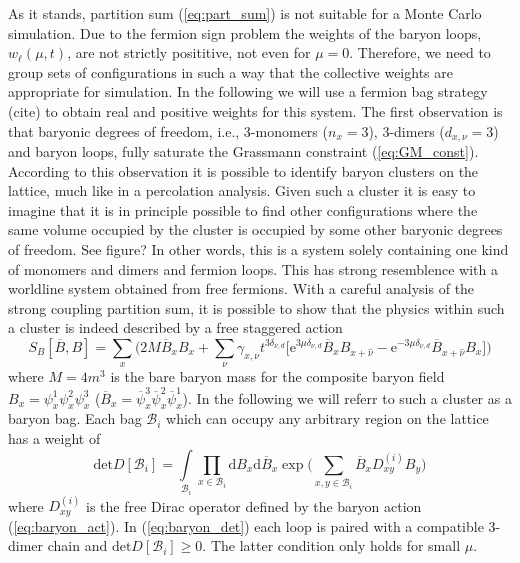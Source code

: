 \documentclass{PoS}
\begin{document}
As it stands, partition sum (\ref{eq:part_sum}) is not suitable for a Monte Carlo simulation. Due to the fermion sign problem the weights of the baryon loops, $w_{\ell}(\mu,t)$, are not strictly posititive, not even for $\mu = 0$. Therefore, we need to group sets of configurations in such a way that the collective weights are appropriate for simulation. In the following we will use a fermion bag strategy (cite) to obtain real and positive weights for this system. The first observation is that baryonic degrees of freedom, i.e., 3-monomers ($n_x = 3$), 3-dimers ($d_{x,\nu}=3$) and baryon loops, fully saturate the Grassmann constraint (\ref{eq:GM_const}). According to this observation it is possible to identify baryon clusters on the lattice, much like in a percolation analysis. Given such a cluster it is easy to imagine that it is in principle possible to find other configurations where the same volume occupied by the cluster is occupied by some other baryonic degrees of freedom. See figure? In other words, this is a system solely containing one kind of monomers and dimers and fermion loops. This has strong resemblence with a worldline system obtained from free fermions. With a careful analysis of the strong coupling partition sum, it is possible to show that the physics within such a cluster is indeed described by a free staggered action 
\begin{equation}
S_B\left[\overline{B},B\right] = \sum_x\Big(2M\overline{B}_x B_x +\sum_{\nu} \gamma_{x,\nu}t^{3\delta_{\nu,d}}\Big[ \text{e}^{3\mu\delta_{\nu,d}}\overline{B}_{x} B_{x+\hat{\nu}} - \text{e}^{-3\mu\delta_{\nu,d}}\overline{B}_{x+\hat{\nu}}B_{x} \Big] \Big)
\label{eq:baryon_act}
\end{equation}
where $M = 4m^3$ is the bare baryon mass for the composite baryon field $B_x = \psi^{1}_x\psi^{2}_x\psi^{3}_x$ ($\overline{B}_x = \overline{\psi}^{3}_x\overline{\psi}^{2}_x\overline{\psi}^{1}_x$). In the following we will referr to such a cluster as a baryon bag. Each bag $\mathcal{B}_i$ which can occupy any arbitrary region on the lattice has a weight of
\begin{equation}
\text{det} D[\mathcal{B}_i]  = \int\limits_{\mathcal{B}_i} \prod_{x\in\mathcal{B}_i} \text{d} B_x \text{d}\overline{B}_x \exp\Big(\sum\limits_{x,y \in \mathcal{B}_i} \overline{B}_x D^{(i)}_{xy} B_y\Big)
\label{eq:baryon_det}
\end{equation}
where $D^{(i)}_{xy}$ is the free Dirac operator defined by the baryon action (\ref{eq:baryon_act}). In (\ref{eq:baryon_det}) each loop is paired with a compatible 3-dimer chain and $\text{det} D[\mathcal{B}_i] \geq 0$. The latter condition only holds for small $\mu$.\\
\end{document}
